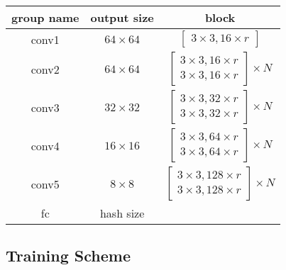 \documentclass{article}
\renewenvironment{table}{\par\medskip\noindent\minipage{\linewidth}}{\endminipage\par\medskip}
\begin{document}
\begin{multicols}{2}
\begin{table}
\label{logonetplus}
\begin{small}\begin{sc}\begin{center}
\begin{tabular}{|c|c|c|}
  \hline			
  group name & output size & block \\ \hline
  conv1 & $64 \times 64$ & $\begin{bmatrix}3\times3,16 \times r \end{bmatrix}$ \\ \hline
  conv2 & $64 \times 64$ &  $\begin{bmatrix}3\times3,16\times r \\ 3\times 3,16\times r\end{bmatrix}\times N$ \\ \hline
  conv3 & $32 \times 32$ &  $\begin{bmatrix}3\times3,32\times r \\ 3\times 3,32\times r\end{bmatrix}\times N$ \\ \hline
  conv4 & $16 \times 16$ &  $\begin{bmatrix}3\times3,64\times r \\ 3\times 3,64\times r\end{bmatrix}\times N$ \\ \hline
  conv5 & $8 \times 8$ &  $\begin{bmatrix}3\times3,128\times r \\ 3\times 3,128\times r\end{bmatrix}\times N$ \\ \hline
      fc    & hash size & \\ \hline  
\end{tabular}
\end{center}\end{sc}\end{small}
\end{table}

\subsection{Training Scheme}


\end{multicols}
\end{document}
